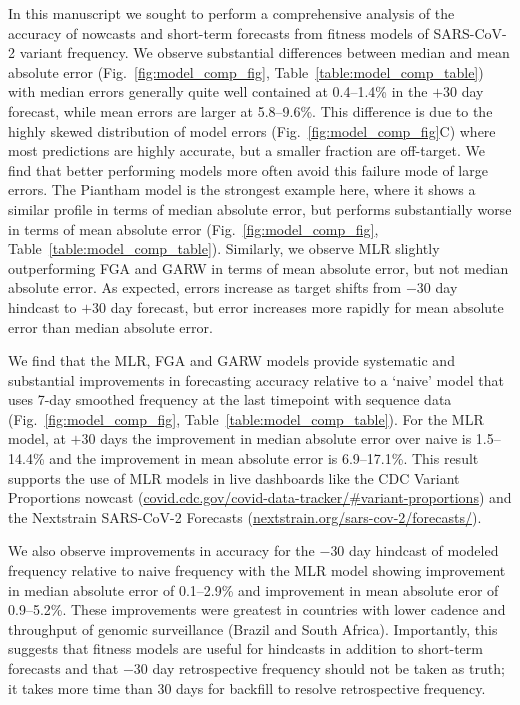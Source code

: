 \documentclass[11pt,oneside,letterpaper]{article}
\begin{document}
In this manuscript we sought to perform a comprehensive analysis of the accuracy of nowcasts and short-term forecasts from fitness models of SARS-CoV-2 variant frequency.
We observe substantial differences between median and mean absolute error (Fig.~\ref{fig:model_comp_fig}, Table~\ref{table:model_comp_table}) with median errors generally quite well contained at 0.4--1.4\% in the $+30$ day forecast, while mean errors are larger at 5.8--9.6\%.
This difference is due to the highly skewed distribution of model errors (Fig.~\ref{fig:model_comp_fig}C) where most predictions are highly accurate, but a smaller fraction are off-target.
We find that better performing models more often avoid this failure mode of large errors.
The Piantham \cite{piantham2021estimating} model is the strongest example here, where it shows a similar profile in terms of median absolute error, but performs substantially worse in terms of mean absolute error (Fig.~\ref{fig:model_comp_fig}, Table~\ref{table:model_comp_table}).
Similarly, we observe MLR slightly outperforming FGA and GARW \cite{figgins2022sars} in terms of mean absolute error, but not median absolute error.
As expected, errors increase as target shifts from $-30$ day hindcast to $+30$ day forecast, but error increases more rapidly for mean absolute error than median absolute error.


\sloppy %
We find that the MLR, FGA and GARW models provide systematic and substantial improvements in forecasting accuracy relative to a `naive' model that uses 7-day smoothed frequency at the last timepoint with sequence data (Fig.~\ref{fig:model_comp_fig}, Table~\ref{table:model_comp_table}).
For the MLR model, at $+30$ days the improvement in median absolute error over naive is 1.5--14.4\% and the improvement in mean absolute error is 6.9--17.1\%.
This result supports the use of MLR models in live dashboards like the CDC Variant Proportions nowcast (\href{https://covid.cdc.gov/covid-data-tracker/\#variant-proportions}{covid.cdc.gov/covid-data-tracker/\#variant-proportions}) and the Nextstrain SARS-CoV-2 Forecasts (\href{https://nextstrain.org/sars-cov-2/forecasts/}{nextstrain.org/sars-cov-2/forecasts/}).

We also observe improvements in accuracy for the $-30$ day hindcast of modeled frequency relative to naive frequency with the MLR model showing improvement in median absolute error of 0.1--2.9\% and improvement in mean absolute eror of 0.9--5.2\%.
These improvements were greatest in countries with lower cadence and throughput of genomic surveillance (Brazil and South Africa).
Importantly, this suggests that fitness models are useful for hindcasts in addition to short-term forecasts and that $-30$ day retrospective frequency should not be taken as truth; it takes more time than 30 days for backfill to resolve retrospective frequency.
\end{document}
